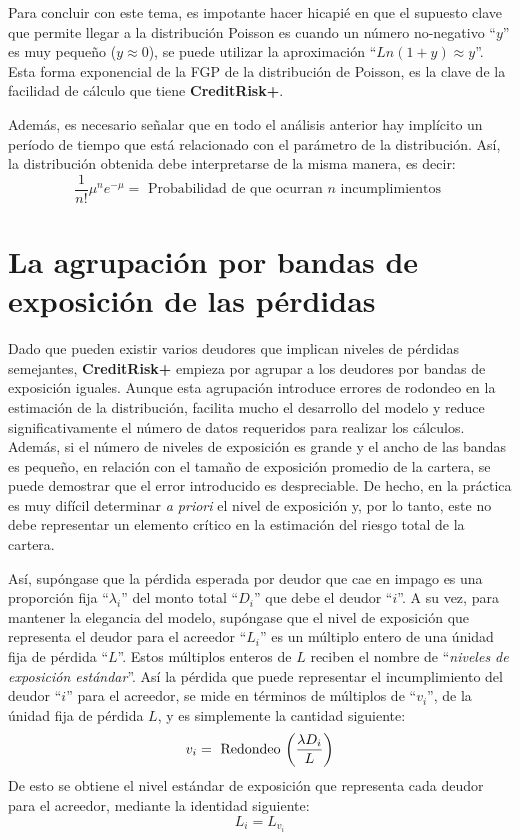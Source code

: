 \documentclass[
  12pt,
]{krantz}
\theoremstyle{definition}
\theoremstyle{definition}
\theoremstyle{definition}
\theoremstyle{remark}
\begin{document}
Para concluir con este tema, es impotante hacer hicapié en que el supuesto clave que permite llegar a la distribución Poisson es cuando un número no-negativo ``\(y\)'' es muy pequeño (\(y\approx 0\)), se puede utilizar la aproximación ``\(Ln(1+y)\approx y\)''. Esta forma exponencial de la FGP de la distribución de Poisson, es la clave de la facilidad de cálculo que tiene \textbf{CreditRisk+}.

Además, es necesario señalar que en todo el análisis anterior hay implícito un período de tiempo que está relacionado con el parámetro de la distribución. Así, la distribución obtenida debe interpretarse de la misma manera, es decir:\[\frac{1}{n!}\mu^ne^{-\mu}=\textrm{ Probabilidad de que ocurran } n \textrm{ incumplimientos }\]

\hypertarget{la-agrupacion-por-bandas-de-exposicion-de-las-perdidas}{%
\section{La agrupación por bandas de exposición de las pérdidas}\label{la-agrupacion-por-bandas-de-exposicion-de-las-perdidas}}

Dado que pueden existir varios deudores que implican niveles de pérdidas semejantes, \textbf{CreditRisk+} empieza por agrupar a los deudores por bandas de exposición iguales. Aunque esta agrupación introduce errores de rodondeo en la estimación de la distribución, facilita mucho el desarrollo del modelo y reduce significativamente el número de datos requeridos para realizar los cálculos. Además, si el número de niveles de exposición es grande y el ancho de las bandas es pequeño, en relación con el tamaño de exposición promedio de la cartera, se puede demostrar que el error introducido es despreciable. De hecho, en la práctica es muy difícil determinar \emph{a priori} el nivel de exposición y, por lo tanto, este no debe representar un elemento crítico en la estimación del riesgo total de la cartera.

Así, supóngase que la pérdida esperada por deudor que cae en impago es una proporción fija ``\(\lambda_i\)'' del monto total ``\(D_i\)'' que debe el deudor ``\(i\)''. A su vez, para mantener la elegancia del modelo, supóngase que el nivel de exposición que representa el deudor para el acreedor ``\(L_i\)'' es un múltiplo entero de una únidad fija de pérdida ``\(L\)''. Estos múltiplos enteros de \(L\) reciben el nombre de ``\emph{niveles de exposición estándar}''. Así la pérdida que puede representar el incumplimiento del deudor ``\(i\)'' para el acreedor, se mide en términos de múltiplos de ``\(v_i\)'', de la únidad fija de pérdida \(L\), y es simplemente la cantidad siguiente:\[v_i=\textrm{ Redondeo }\bigg{(}\frac{\lambda D_i}{L}\bigg{)}\]
De esto se obtiene el nivel estándar de exposición que representa cada deudor para el acreedor, mediante la identidad siguiente:\[L_i=L_{v_i}\]
\end{document}
